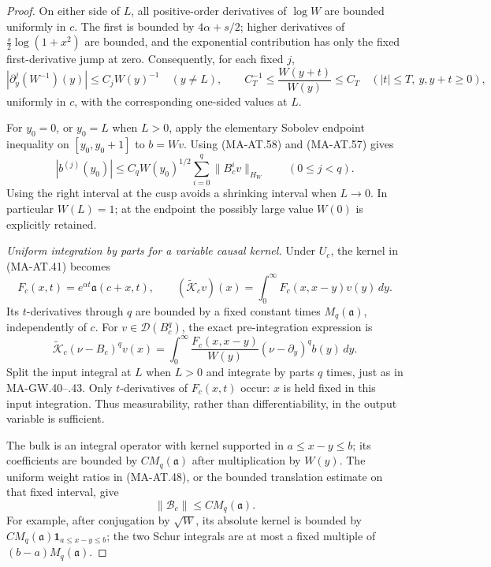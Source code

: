 \begin{proof}
On either side of \(L\), all positive-order derivatives
of \(\log W\) are bounded uniformly in \(c\).
The first is bounded by \(4\alpha+s/2\); higher derivatives
of \(\tfrac s2\log(1+x^2)\) are bounded, and the
exponential contribution has only the fixed first-derivative
jump at zero.
Consequently, for each fixed \(j\),
\[
 |\partial_y^j(W^{-1})(y)|\le C_j W(y)^{-1}
       \quad(y\ne L),\qquad
 C_T^{-1}\le\frac{W(y+t)}{W(y)}\le C_T
       \quad(|t|\le T,\ y,y+t\ge0),
 \tag{MA-AT.58}
\]
uniformly in \(c\), with the corresponding one-sided values
at \(L\).

For \(y_0=0\), or \(y_0=L\) when \(L>0\), apply the elementary
Sobolev endpoint inequality on \([y_0,y_0+1]\) to \(b=Wv\).
Using (MA-AT.58) and (MA-AT.57) gives
\[
 |b^{(j)}(y_0)|
   \le C_q W(y_0)^{1/2}
              \sum_{i=0}^q\|B_c^iv\|_{H_W}
                    \qquad(0\le j<q).
 \tag{MA-AT.59}
\]
Using the right interval at the cusp avoids a shrinking
interval when \(L\to0\).
In particular \(W(L)=1\); at the endpoint the possibly
large value \(W(0)\) is explicitly retained.

\emph{Uniform integration by parts for a variable causal kernel.}
Under \(U_c\), the kernel in (MA-AT.41) becomes
\[
 F_c(x,t)=e^{\alpha t}\mathfrak a(c+x,t),\qquad
 (\widetilde{\mathcal K}_cv)(x)
     =\int_0^\infty F_c(x,x-y)v(y)\,dy .
 \tag{MA-AT.60}
\]
Its \(t\)-derivatives through \(q\) are bounded by a fixed
constant times \(M_q(\mathfrak a)\), independently of \(c\).
For \(v\in\mathcal D(B_c^q)\), the exact pre-integration
expression is
\[
 \widetilde{\mathcal K}_c(\nu-B_c)^qv(x)
  =\int_0^\infty
        \frac{F_c(x,x-y)}{W(y)}
                   (\nu-\partial_y)^q b(y)\,dy .
 \tag{MA-AT.61}
\]
Split the input integral at \(L\) when \(L>0\) and integrate
by parts \(q\) times, just as in MA-GW.40--.43.
Only \(t\)-derivatives of \(F_c(x,t)\) occur: \(x\) is held
fixed in this input integration.
Thus measurability, rather than differentiability, in the
output variable is sufficient.

The bulk is an integral operator with kernel supported in
\(a\le x-y\le b\); its coefficients are bounded by
\(C M_q(\mathfrak a)\) after multiplication by \(W(y)\).
The uniform weight ratios in (MA-AT.48), or the bounded
translation estimate on that fixed interval, give
\[
                         \|\mathcal B_c\|
                                \le C M_q(\mathfrak a).
 \tag{MA-AT.62}
\]
For example, after conjugation by \(\sqrt W\), its absolute
kernel is bounded by
\(C M_q(\mathfrak a)\mathbf1_{a\le x-y\le b}\);
the two Schur integrals are at most a fixed multiple of
\((b-a)M_q(\mathfrak a)\).


\end{proof}
